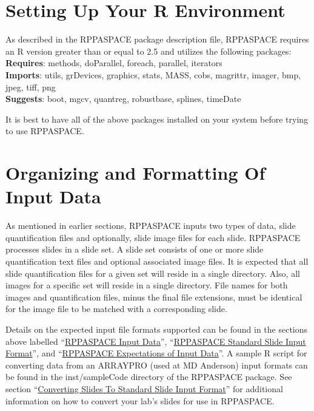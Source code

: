 \documentclass[
]{article}
\begin{document}
\hypertarget{r_env}{%
\section{Setting Up Your R Environment}\label{r_env}}

As described in the RPPASPACE package description file, RPPASPACE
requires an R version greater than or equal to 2.5 and utilizes the
following packages:\\
\textbf{Requires}: methods, doParallel, foreach, parallel, iterators\\
\textbf{Imports}: utils, grDevices, graphics, stats, MASS, cobs,
magrittr, imager, bmp, jpeg, tiff, png\\
\textbf{Suggests}: boot, mgcv, quantreg, robustbase, splines, timeDate

It is best to have all of the above packages installed on your system
before trying to use RPPASPACE.

\hypertarget{formatting_inputs}{%
\section{Organizing and Formatting Of Input
Data}\label{formatting_inputs}}

As mentioned in earlier sections, RPPASPACE inputs two types of data,
slide quantification files and optionally, slide image files for each
slide. RPPASPACE processes slides in a slide set. A slide set consists
of one or more slide quantification text files and optional associated
image files. It is expected that all slide quantification files for a
given set will reside in a single directory. Also, all images for a
specific set will reside in a single directory. File names for both
images and quantification files, minus the final file extensions, must
be identical for the image file to be matched with a corresponding
slide.

Details on the expected input file formats supported can be found in the
sections above labelled ``\protect\hyperlink{input_data}{RPPASPACE Input
Data}'', ``\protect\hyperlink{slide_input_format}{RPPASPACE Standard
Slide Input Format}'', and ``\protect\hyperlink{expectations}{RPPASPACE
Expectations of Input Data}''. A sample R script for converting data
from an ARRAYPRO (used at MD Anderson) input formats can be found in the
inst/sampleCode directory of the RPPASPACE package. See section
``\protect\hyperlink{converting}{Converting Slides To Standard Slide
Input Format}'' for additional information on how to convert your lab's
slides for use in RPPASPACE.
\end{document}
